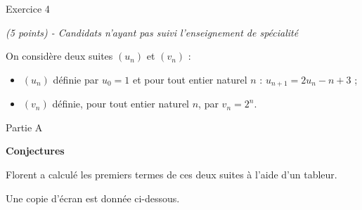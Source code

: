 
%
\begin{h2}Exercice 4\end{h2}
\textit{(5 points) - Candidats n'ayant pas suivi l'enseignement de spécialité}
\par
On considère deux suites $\left(u_n\right)$ et $\left(v_n\right)$ :
\begin{itemize}
     \item
     $\left(u_n\right)$ définie par $u_0 = 1$ et pour tout entier naturel $n$ :  $u_{n+1} = 2u_n-n+3$ ;
     \item
     $\left(v_n\right)$ définie, pour tout entier naturel $n$, par $v_n = 2^n$.
\end{itemize}
\begin{h3}Partie A\end{h3}
\textbf{ Conjectures}
\par
Florent a calculé les premiers termes de ces deux suites à l'aide d'un tableur.
\par
Une copie d'écran est donnée ci-dessous.

